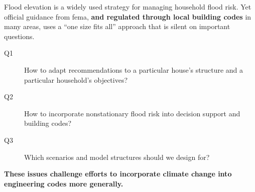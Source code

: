 Flood elevation is a widely used strategy for managing household flood risk.
Yet official guidance from \gls{fema}, \textbf{and regulated through local building codes} in many areas, uses a ``one size fits all'' approach that is silent on important questions.
\begin{framed}
    \begin{description}
        \item[Q1] How to adapt recommendations to a particular house's structure and a particular household's objectives?
        \item[Q2] How to incorporate nonstationary flood risk into decision support and building codes?
        \item[Q3] Which scenarios and model structures should we design for?
    \end{description}
\end{framed}
\textbf{These issues challenge efforts to incorporate climate change into engineering codes more generally.}